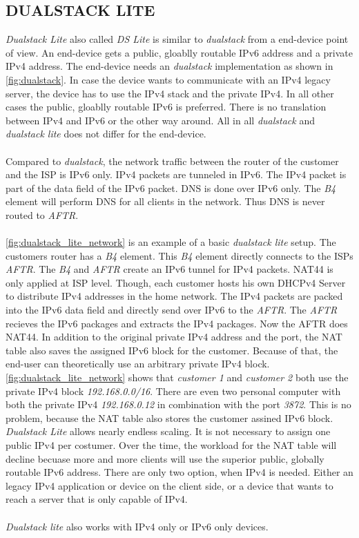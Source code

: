 \documentclass[format=sigconf, natbib=true, nonacm=true]{acmart}
\begin{document}
    \subsection{DUALSTACK LITE}
    \textit{Dualstack Lite} also called \textit{DS Lite} is similar to \textit{dualstack} from a end-device point of view. An end-device gets a public, gloablly routable IPv6 address and a private IPv4 address. The end-device needs an \textit{dualstack} implementation as shown in \ref{fig:dualstack}. In case the device wants to communicate with an IPv4 legacy server, the device has to use the IPv4 stack and the private IPv4. In all other cases the public, gloablly routable IPv6 is preferred. There is no translation between IPv4 and IPv6 or the other way around. All in all \textit{dualstack} and \textit{dualstack lite} does not differ for the end-device.\\\\Compared to \textit{dualstack}, the network traffic between the router of the customer and the ISP is IPv6 only. IPv4 packets are tunneled in IPv6. The IPv4 packet is part of the data field of the IPv6 packet. DNS is done over IPv6 only. The \textit{B4} element will perform DNS for all clients in the network. Thus DNS is never routed to \textit{AFTR}.\\\\\ref{fig:dualstack_lite_network} is an example of a basic \textit{dualstack lite} setup. The customers router has a \textit{B4} element. This \textit{B4} element directly connects to the ISPs \textit{AFTR}. The \textit{B4} and \textit{AFTR} create an IPv6 tunnel for IPv4 packets. NAT44 is only applied at ISP level. Though, each customer hosts his own DHCPv4 Server to distribute IPv4 addresses in the home network. The IPv4 packets are packed into the IPv6 data field and directly send over IPv6 to the \textit{AFTR}. The \textit{AFTR} recieves the IPv6 packages and extracts the IPv4 packages. Now the AFTR does NAT44. In addition to the original private IPv4 address and the port, the NAT table also saves the assigned IPv6 block for the customer. Because of that, the end-user can theoretically use an arbitrary private IPv4 block\cite{rfc6333}. \ref{fig:dualstack_lite_network} shows that \textit{customer 1} and \textit{customer 2} both use the private IPv4 block \textit{192.168.0.0/16}. There are even two personal computer with both the private IPv4 \textit{192.168.0.12} in combination with the port \textit{3872}. This is no problem, because the NAT table also stores the customer assined IPv6 block. \textit{Dualstack Lite} allows nearly endless scaling. It is not necessary to assign one public IPv4 per costumer. Over the time, the workload for the NAT table will decline becuase more and more clients will use the superior public, globally routable IPv6 address. There are only two option, when IPv4 is needed. Either an legacy IPv4 application or device on the client side, or a device that wants to reach a server that is only capable of IPv4.\\\\\textit{Dualstack lite} also works with IPv4 only or IPv6 only devices. 
\end{document}
